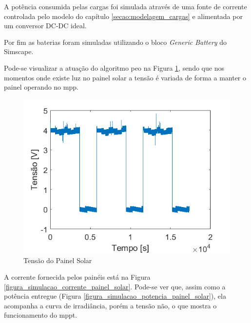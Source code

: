 A potência consumida pelas cargas foi simulada através de uma fonte de corrente controlada pelo modelo do capítulo \ref{secao:modelagem_cargas} e alimentada por um conversor DC-DC ideal.

Por fim as baterias foram simuladas utilizando o bloco \textit{Generic Battery} do Simscape.

Pode-se visualizar a atuação do algoritmo \gls{peo} na Figura \ref{figura_simulacao_tensao_painel_solar}, sendo que nos momentos onde existe luz no painel solar a tensão é variada de forma a manter o painel operando no \gls{mpp}.

\begin{figure}[!htpb]
\begin{center}
\includegraphics[scale=0.5]{figures/simulatedSolarPanelVoltage.png}
\caption{Tensão do Painel Solar}
\label{figura_simulacao_tensao_painel_solar}
\end{center}
\end{figure}

A corrente fornecida pelos painéis está na Figura \ref{figura_simulacao_corrente_painel_solar}. Pode-se ver que, assim como a potência entregue (Figura \ref{figura_simulacao_potencia_painel_solar}), ela acompanha a curva de irradiância, porém a tensão não, o que mostra o funcionamento do \gls{mppt}. 

